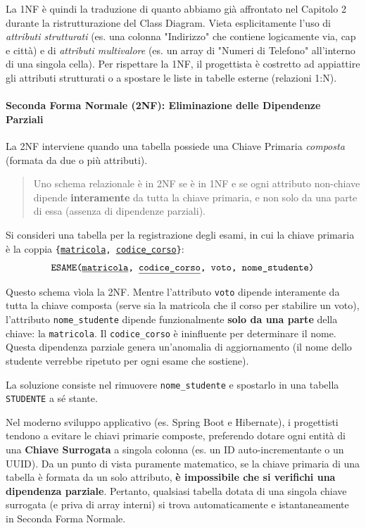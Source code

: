 La 1NF è quindi la traduzione di quanto abbiamo già affrontato nel Capitolo 2 durante la ristrutturazione del Class Diagram. Vieta esplicitamente l'uso di \textit{attributi strutturati} (es. una colonna "Indirizzo" che contiene logicamente via, cap e città) e di \textit{attributi multivalore} (es. un array di "Numeri di Telefono" all'interno di una singola cella). Per rispettare la 1NF, il progettista è costretto ad appiattire gli attributi strutturati o a spostare le liste in tabelle esterne (relazioni 1:N).

\paragraph{Seconda Forma Normale (2NF): Eliminazione delle Dipendenze Parziali}
La 2NF interviene quando una tabella possiede una Chiave Primaria \textit{composta} (formata da due o più attributi). 
\begin{quote}
Uno schema relazionale è in 2NF se è in 1NF e se ogni attributo non-chiave dipende \textbf{interamente} da tutta la chiave primaria, e non solo da una parte di essa (assenza di dipendenze parziali).
\end{quote}

\begin{example}
Si consideri una tabella per la registrazione degli esami, in cui la chiave primaria è la coppia \texttt{\{\underline{matricola}, \underline{codice\_corso}\}}:
$$ \texttt{ESAME(\underline{matricola}, \underline{codice\_corso}, voto, nome\_studente)} $$

Questo schema vìola la 2NF. Mentre l'attributo \texttt{voto} dipende interamente da tutta la chiave composta (serve sia la matricola che il corso per stabilire un voto), l'attributo \texttt{nome\_studente} dipende funzionalmente \textbf{solo da una parte} della chiave: la \texttt{matricola}. Il \texttt{codice\_corso} è ininfluente per determinare il nome. Questa dipendenza parziale genera un'anomalia di aggiornamento (il nome dello studente verrebbe ripetuto per ogni esame che sostiene).

La soluzione consiste nel rimuovere \texttt{nome\_studente} e spostarlo in una tabella \texttt{STUDENTE} a sé stante.
\end{example}

\begin{observation}
Nel moderno sviluppo applicativo (es. Spring Boot e Hibernate), i progettisti tendono a evitare le chiavi primarie composte, preferendo dotare ogni entità di una \textbf{Chiave Surrogata} a singola colonna (es. un ID auto-incrementante o un UUID). 
Da un punto di vista puramente matematico, se la chiave primaria di una tabella è formata da un solo attributo, \textbf{è impossibile che si verifichi una dipendenza parziale}. Pertanto, qualsiasi tabella dotata di una singola chiave surrogata (e priva di array interni) si trova automaticamente e istantaneamente in Seconda Forma Normale.
\end{observation}